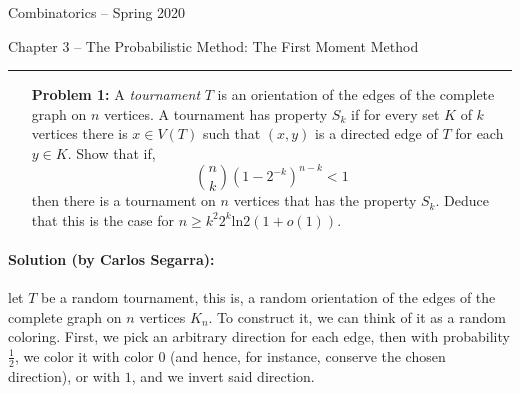 \documentclass{amsart}
\theoremstyle{plain}
\begin{document}
{\Large Combinatorics -- Spring 2020}

{\Large Chapter 3 -- The Probabilistic Method: The First Moment Method}

\vspace{0.5cm}

 \hrule

\vspace{0.5cm}

\begin{enumerate}


\item[\textbf{Problem 1:}]
    A \emph{tournament} $T$ is an orientation of the edges of the complete graph on $n$ vertices.
    A tournament has property $S_k$ if for every set $K$ of $k$ vertices there is $x \in V(T)$ such that $(x,y)$ is a directed edge of $T$ for each $y \in K$.
    Show that if,
    \begin{equation*}
        \binom{n}{k}\left(1 - 2^{-k}\right)^{n-k} < 1
    \end{equation*}
    then there is a tournament on $n$ vertices that has the property $S_k$.
        Deduce that this is the case for $n \geq k^2 2^k \text{ln} 2(1 + o(1))$.
\end{enumerate}
%
%
\paragraph{\textbf{Solution (by Carlos Segarra):}} 
let $T$ be a random tournament, this is, a random orientation of the edges of the complete graph on $n$ vertices $K_n$.
To construct it, we can think of it as a random coloring.
First, we pick an arbitrary direction for each edge, then with probability $\frac{1}{2}$, we color it with color 0 (and hence, for instance, conserve the chosen direction), or with $1$, and we invert said direction.
\end{document}
